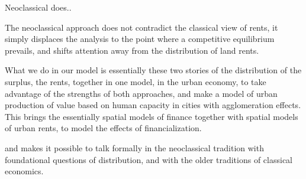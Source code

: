 Neoclassical does..

The neoclassical approach does not contradict the classical view of rents, it simply displaces the analysis to the point where a competitive equilibrium prevails, and shifts attention away from the distribution of land rents. %

What we do in our model is essentially these two stories of the distribution of the surplus, the rents, together in one model, in the urban economy, to take advantage of the strengths of both approaches, and make a model of %
urban production of value based on human capacity in cities with agglomeration effects. 
This brings the essentially spatial models of finance together with spatial models of urban rents, to model the effects of financialization. 

and makes it possible to talk formally in the neoclassical tradition with foundational questions of distribution, and with the older traditions of classical economics. 




